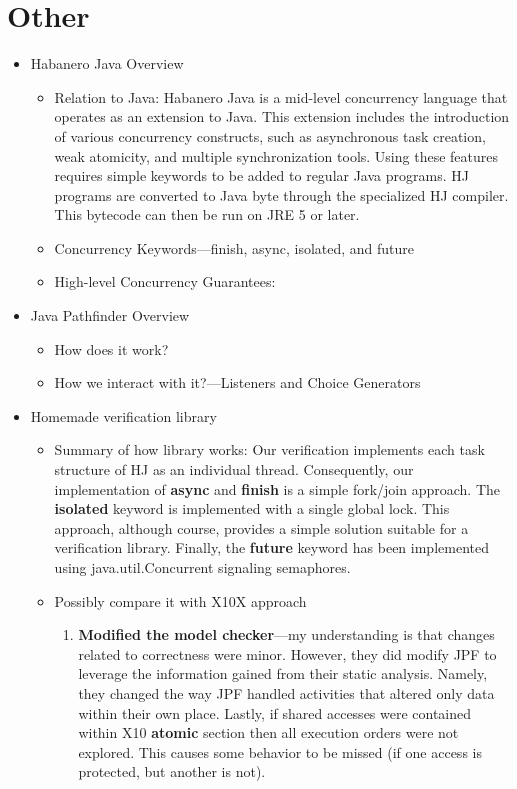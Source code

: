 \section{Other}
\begin{itemize}
\item Habanero Java Overview
	\begin{itemize}
	\item Relation to Java: Habanero Java is a mid-level concurrency language that operates as an extension to Java. This extension includes the introduction of various concurrency constructs, such as asynchronous task creation, weak atomicity, and multiple synchronization tools. Using these features requires simple keywords to be added to regular Java programs. HJ programs are converted to Java byte through the specialized HJ compiler. This bytecode can then be run on JRE 5 or later.
	\item Concurrency Keywords---finish, async, isolated, and future
	\item High-level Concurrency Guarantees:   
	\end{itemize}
\item Java Pathfinder Overview
	\begin{itemize}
	\item How does it work?
	\item How we interact with it?---Listeners and Choice Generators
	\end{itemize}
\item Homemade verification library
	\begin{itemize}
	\item Summary of how library works: Our verification implements each task structure of HJ as an individual thread. Consequently, our implementation of \textbf{async} and \textbf{finish} is a simple fork/join approach. The \textbf{isolated} keyword is implemented with a single global lock. This approach, although course, provides a simple solution suitable for a verification library. Finally, the \textbf{future} keyword has been implemented using java.util.Concurrent signaling semaphores.
	\item Possibly compare it with X10X approach
		\begin{enumerate}
			\item \textbf{Modified the model checker}---my understanding is that changes related to correctness were minor. However, they did modify JPF to leverage the information gained from their static analysis. Namely, they changed the way JPF handled activities that altered only data within their own place. Lastly, if shared accesses were contained within X10 \textbf{atomic} section then all execution orders were not explored. This causes some behavior to be missed (if one access is protected, but another is not).
			

\end{enumerate}
\end{itemize}
\end{itemize}
